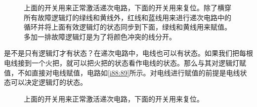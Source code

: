 \begin{figure}[!ht]
\begin{center}
\end{center}
\caption{上面的开关用来正常激活递次电路，下面的开关用来复位。除了横穿所有故障逻辑灯的绿线和黄线外，红线和蓝线用来进行递次电路中的循环并将上面有效逻辑灯的状态同步到下面，绿线和黄线用来赋值。多加一排故障逻辑灯是为了将颜色冲突的线分开。}
\label{i86:87}
\end{figure}

是不是只有逻辑灯才有状态？在递次电路中，电线也可以有状态。如果我们把每根电线接到一个火把，就可以把火把的状态看作电线的状态。那么与其对逻辑灯赋值，不如直接对电线赋值，电路如\autoref{i88:89}所示。对电线进行赋值的前提是电线状态可以决定逻辑灯的状态。

\begin{figure}[!ht]
\begin{center}
\end{center}
\caption{上面的开关用来正常激活递次电路，下面的开关用来复位。}
\label{i88:89}
\end{figure}

